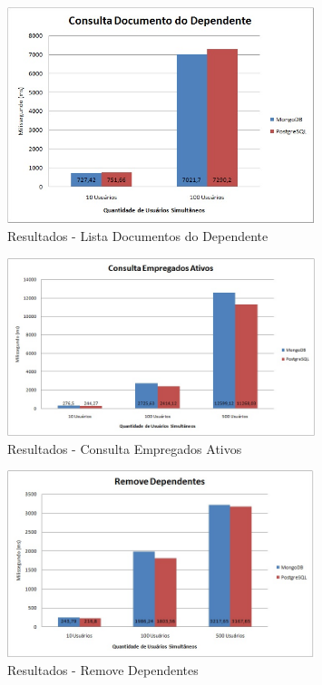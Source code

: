 \begin{figure}[!htbp]
	\begin{center}
		\includegraphics[width=0.8\textwidth]{resultados/consulta_doc_dependente}
	\end{center}
	\caption{Resultados - Lista Documentos do Dependente}
	\label{fig:resultlistadocdependente}
\end{figure}

\begin{figure}[!htbp]
	\begin{center}
		\includegraphics[width=0.8\textwidth]{resultados/consulta_estatistica}
	\end{center}
	\caption{Resultados - Consulta Empregados Ativos}
	\label{fig:resultlistaempregadosativos}
\end{figure}

\begin{figure}[!htbp]
	\begin{center}
		\includegraphics[width=0.8\textwidth]{resultados/remove_dependentes}
	\end{center}
	\caption{Resultados - Remove Dependentes}
	\label{fig:resultremovedependentes}
\end{figure}

